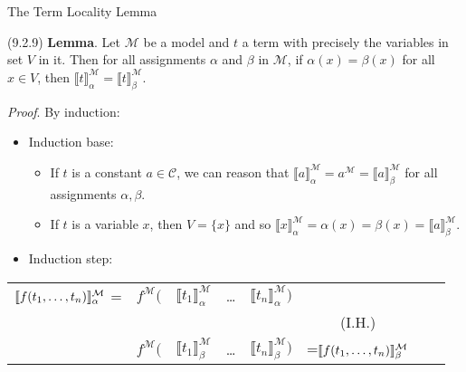 \begin{frame}{The Term Locality Lemma}

 (9.2.9) \textbf{Lemma}. Let $\mathcal{M}$ be a model and $t$ a term with precisely the variables in set $V$ in it. Then for all assignments $\alpha$ and $\beta$ in $\mathcal{M}$, if $\alpha(x)=\beta(x)$ for all $x\in V$, then $\llbracket t\rrbracket_\alpha^\mathcal{M}=\llbracket t\rrbracket_\beta^\mathcal{M}$.
		
\vspace{2ex}	
		
\emph{Proof}. By induction:

\begin{itemize}

	\item Induction base:
	
	\begin{itemize}
	
	\item If $t$ is a constant $a\in\mathcal{C}$, we can reason that $\llbracket a\rrbracket^\mathcal{M}_\alpha=a^\mathcal{M}=\llbracket a\rrbracket^\mathcal{M}_\beta$ for all assignments $\alpha,\beta$. 
	
	\item If $t$ is a variable $x$, then $V=\{x\}$ and so $\llbracket x\rrbracket^\mathcal{M}_\alpha=\alpha(x)=\beta(x)=\llbracket a\rrbracket^\mathcal{M}_\beta$. 
	
	\end{itemize}
	
	\item Induction step:

\vspace{-2ex}	
	\end{itemize}

	{\small
	\begin{center}
		\begin{tabular}{c c c c c c ll}
		$\llbracket f(t_1, \mathellipsis, t_n)\rrbracket^\mathcal{M}_\alpha$ = & $f^\mathcal{M}($ & $\llbracket t_1\rrbracket^\mathcal{M}_\alpha$ &  \dots & $\llbracket t_n\rrbracket^\mathcal{M}_\alpha)$\\
		 & & \rotatebox{90}{=} & & \rotatebox{90}{=} &(I.H.)\\
		& $f^\mathcal{M}($ & $\llbracket t_1\rrbracket^\mathcal{M}_\beta$ &  \dots & $\llbracket t_n\rrbracket^\mathcal{M}_\beta)$&=$\llbracket f(t_1, \mathellipsis, t_n)\rrbracket^\mathcal{M}_\beta$ \\
		\end{tabular}
		\end{center}}


\end{frame}

